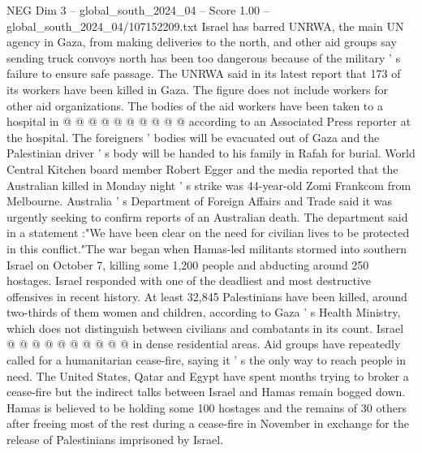 \begin{textsample}{NEG Dim 3 – global\_south\_2024\_04 – Score 1.00 – global\_south\_2024\_04/107152209.txt}
Israel has barred UNRWA, the main UN agency in Gaza, from making deliveries to the north, and other aid groups say sending truck convoys north has been too dangerous because of the military ' s failure to ensure safe passage.
The UNRWA said in its latest report that 173 of its workers have been killed in Gaza.
The figure does not include workers for other aid organizations.
The bodies of the aid workers have been taken to a hospital in @ @ @ @ @ @ @ @ @ @ according to an Associated Press reporter at the hospital.
The foreigners ' bodies will be evacuated out of Gaza and the Palestinian driver ' s body will be handed to his family in Rafah for burial.
World Central Kitchen board member Robert Egger and the media reported that the Australian killed in Monday night ' s strike was 44-year-old Zomi Frankcom from Melbourne.
Australia ' s Department of Foreign Affairs and Trade said it was urgently seeking to confirm reports of an Australian death.
The department said in a statement :"We have been clear on the need for civilian lives to be protected in this conflict."The war began when Hamas-led militants stormed into southern Israel on October 7, killing some 1,200 people and abducting around 250 hostages.
Israel responded with one of the deadliest and most destructive offensives in recent history.
At least 32,845 Palestinians have been killed, around two-thirds of them women and children, according to Gaza ' s Health Ministry, which does not distinguish between civilians and combatants in its count.
Israel @ @ @ @ @ @ @ @ @ @ in dense residential areas.
Aid groups have repeatedly called for a humanitarian cease-fire, saying it ' s the only way to reach people in need.
The United States, Qatar and Egypt have spent months trying to broker a cease-fire but the indirect talks between Israel and Hamas remain bogged down.
Hamas is believed to be holding some 100 hostages and the remains of 30 others after freeing most of the rest during a cease-fire in November in exchange for the release of Palestinians imprisoned by Israel.

\end{textsample}
